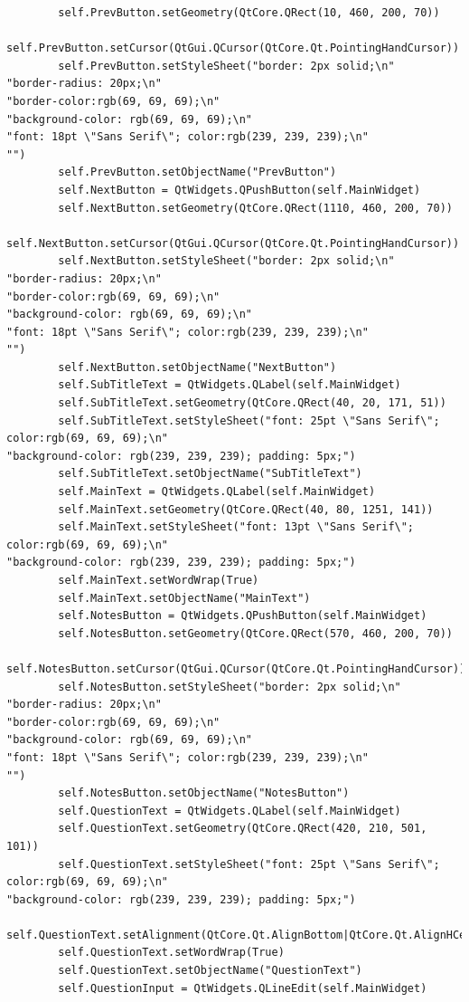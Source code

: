 \documentclass{article}
\begin{document}
\begin{lstlisting}
        self.PrevButton.setGeometry(QtCore.QRect(10, 460, 200, 70))
        self.PrevButton.setCursor(QtGui.QCursor(QtCore.Qt.PointingHandCursor))
        self.PrevButton.setStyleSheet("border: 2px solid;\n"
"border-radius: 20px;\n"
"border-color:rgb(69, 69, 69);\n"
"background-color: rgb(69, 69, 69);\n"
"font: 18pt \"Sans Serif\"; color:rgb(239, 239, 239);\n"
"")
        self.PrevButton.setObjectName("PrevButton")
        self.NextButton = QtWidgets.QPushButton(self.MainWidget)
        self.NextButton.setGeometry(QtCore.QRect(1110, 460, 200, 70))
        self.NextButton.setCursor(QtGui.QCursor(QtCore.Qt.PointingHandCursor))
        self.NextButton.setStyleSheet("border: 2px solid;\n"
"border-radius: 20px;\n"
"border-color:rgb(69, 69, 69);\n"
"background-color: rgb(69, 69, 69);\n"
"font: 18pt \"Sans Serif\"; color:rgb(239, 239, 239);\n"
"")
        self.NextButton.setObjectName("NextButton")
        self.SubTitleText = QtWidgets.QLabel(self.MainWidget)
        self.SubTitleText.setGeometry(QtCore.QRect(40, 20, 171, 51))
        self.SubTitleText.setStyleSheet("font: 25pt \"Sans Serif\"; color:rgb(69, 69, 69);\n"
"background-color: rgb(239, 239, 239); padding: 5px;")
        self.SubTitleText.setObjectName("SubTitleText")
        self.MainText = QtWidgets.QLabel(self.MainWidget)
        self.MainText.setGeometry(QtCore.QRect(40, 80, 1251, 141))
        self.MainText.setStyleSheet("font: 13pt \"Sans Serif\"; color:rgb(69, 69, 69);\n"
"background-color: rgb(239, 239, 239); padding: 5px;")
        self.MainText.setWordWrap(True)
        self.MainText.setObjectName("MainText")
        self.NotesButton = QtWidgets.QPushButton(self.MainWidget)
        self.NotesButton.setGeometry(QtCore.QRect(570, 460, 200, 70))
        self.NotesButton.setCursor(QtGui.QCursor(QtCore.Qt.PointingHandCursor))
        self.NotesButton.setStyleSheet("border: 2px solid;\n"
"border-radius: 20px;\n"
"border-color:rgb(69, 69, 69);\n"
"background-color: rgb(69, 69, 69);\n"
"font: 18pt \"Sans Serif\"; color:rgb(239, 239, 239);\n"
"")
        self.NotesButton.setObjectName("NotesButton")
        self.QuestionText = QtWidgets.QLabel(self.MainWidget)
        self.QuestionText.setGeometry(QtCore.QRect(420, 210, 501, 101))
        self.QuestionText.setStyleSheet("font: 25pt \"Sans Serif\"; color:rgb(69, 69, 69);\n"
"background-color: rgb(239, 239, 239); padding: 5px;")
        self.QuestionText.setAlignment(QtCore.Qt.AlignBottom|QtCore.Qt.AlignHCenter)
        self.QuestionText.setWordWrap(True)
        self.QuestionText.setObjectName("QuestionText")
        self.QuestionInput = QtWidgets.QLineEdit(self.MainWidget)

\end{lstlisting}
\end{document}
